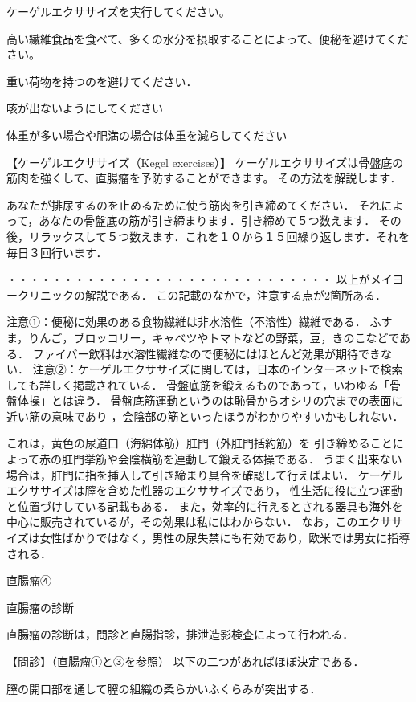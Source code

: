 ケーゲルエクササイズを実行してください。

高い繊維食品を食べて、多くの水分を摂取することによって、便秘を避けてください。

重い荷物を持つのを避けてください．

咳が出ないようにしてください 

体重が多い場合や肥満の場合は体重を減らしてください


【ケーゲルエクササイズ（Kegel exercises）】
ケーゲルエクササイズは骨盤底の筋肉を強くして、直腸瘤を予防することができます。
その方法を解説します．


あなたが排尿するのを止めるために使う筋肉を引き締めてください．
それによって，あなたの骨盤底の筋が引き締まります．引き締めて５つ数えます．
その後，リラックスして５つ数えます．これを１０から１５回繰り返します．それを毎日３回行います． 

・・・・・・・・・・・・・・・・・・・・・・・・・・・・・
以上がメイヨークリニックの解説である．
この記載のなかで，注意する点が2箇所ある．

注意①：便秘に効果のある食物繊維は非水溶性（不溶性）繊維である．
ふすま，りんご，ブロッコリー，キャベツやトマトなどの野菜，豆，きのこなどである．
ファイバー飲料は水溶性繊維なので便秘にはほとんど効果が期待できない．
注意②：ケーゲルエクササイズに関しては，日本のインターネットで検索しても詳しく掲載されている．
骨盤底筋を鍛えるものであって，いわゆる「骨盤体操」とは違う．
骨盤底筋運動というのは恥骨からオシリの穴までの表面に近い筋の意味であり
，会陰部の筋といったほうがわかりやすいかもしれない．




これは，黄色の尿道口（海綿体筋）肛門（外肛門括約筋）を
引き締めることによって赤の肛門挙筋や会陰横筋を連動して鍛える体操である．
うまく出来ない場合は，肛門に指を挿入して引き締まり具合を確認して行えばよい．
ケーゲルエクササイズは膣を含めた性器のエクササイズであり，
性生活に役に立つ運動と位置づけしている記載もある．
また，効率的に行えるとされる器具も海外を中心に販売されているが，その効果は私にはわからない．
なお，このエクササイズは女性ばかりではなく，男性の尿失禁にも有効であり，欧米では男女に指導される．


直腸瘤④

直腸瘤の診断

直腸瘤の診断は，問診と直腸指診，排泄造影検査によって行われる．

【問診】（直腸瘤①と③を参照）
以下の二つがあればほぼ決定である．


膣の開口部を通して膣の組織の柔らかいふくらみが突出する．

